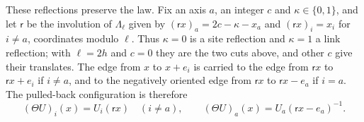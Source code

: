 These reflections preserve the law. Fix an axis $a$, an integer $c$ and
$\kappa\in\{0,1\}$, and let $\mathsf r$ be the involution of $\Lambda_\ell$
given by $(\mathsf rx)_a=2c-\kappa-x_a$ and $(\mathsf rx)_i=x_i$ for
$i\ne a$, coordinates modulo $\ell$. Thus $\kappa=0$ is a site reflection
and $\kappa=1$ a link reflection; with $\ell=2h$ and $c=0$ they are the two
cuts above, and other $c$ give their translates. The edge from $x$ to
$x+e_i$ is carried to the edge from $\mathsf rx$ to $\mathsf rx+e_i$ if
$i\ne a$, and to the negatively oriented edge from $\mathsf rx$ to
$\mathsf rx-e_a$ if $i=a$. The pulled-back configuration is therefore
\begin{equation}\label{eq:ex-lattice-reflection-pullback}
 (\Theta U)_i(x)=U_i(\mathsf rx)\quad(i\ne a),\qquad
 (\Theta U)_a(x)=U_a(\mathsf rx-e_a)^{-1}.
\end{equation}

